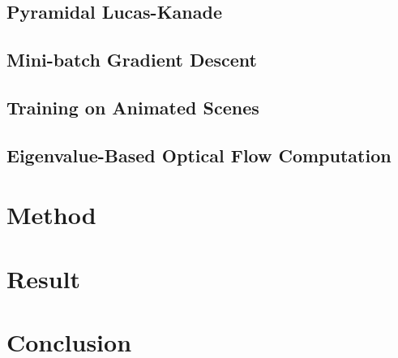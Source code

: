 \documentclass[]{article}
\begin{document}
\subsection{Pyramidal Lucas-Kanade}\label{subsec:pyramidal-lucas-kanade}
\subsection{Mini-batch Gradient Descent}\label{subsec:mini-batch-gradient-descent}
\subsection{Training on Animated Scenes}\label{subsec:training-on-animated-scenes}
\subsection{Eigenvalue-Based Optical Flow Computation}\label{subsec:eigenvalue-based-optical-flow-computation}

\section{Method}\label{sec:method}

\section{Result}\label{sec:result}

\section{Conclusion}\label{sec:conclusion}

\pagebreak
\listoftables
\listoffigures
\printbibliography[heading=bibintoc]{}
\end{document}
